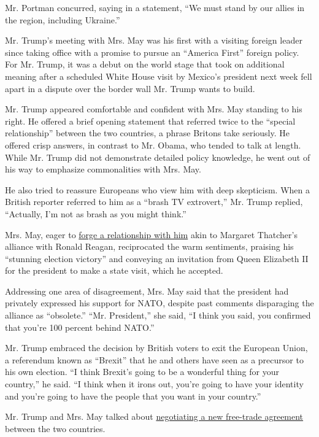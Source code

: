 Mr. Portman concurred, saying in a statement, ``We must stand by our
allies in the region, including Ukraine.''

Mr. Trump's meeting with Mrs. May was his first with a visiting foreign
leader since taking office with a promise to pursue an ``America First''
foreign policy. For Mr. Trump, it was a debut on the world stage that
took on additional meaning after a scheduled White House visit by
Mexico's president next week fell apart in a dispute over the border
wall Mr. Trump wants to build.

Mr. Trump appeared comfortable and confident with Mrs. May standing to
his right. He offered a brief opening statement that referred twice to
the ``special relationship'' between the two countries, a phrase Britons
take seriously. He offered crisp answers, in contrast to Mr. Obama, who
tended to talk at length. While Mr. Trump did not demonstrate detailed
policy knowledge, he went out of his way to emphasize commonalities with
Mrs. May.

He also tried to reassure Europeans who view him with deep skepticism.
When a British reporter referred to him as a ``brash TV extrovert,'' Mr.
Trump replied, ``Actually, I'm not as brash as you might think.''

Mrs. May, eager to
\href{https://www.nytimes3xbfgragh.onion/2017/01/27/world/europe/theresa-may-trump.html}{forge
a relationship with him} akin to Margaret Thatcher's alliance with
Ronald Reagan, reciprocated the warm sentiments, praising his ``stunning
election victory'' and conveying an invitation from Queen Elizabeth II
for the president to make a state visit, which he accepted.

Addressing one area of disagreement, Mrs. May said that the president
had privately expressed his support for NATO, despite past comments
disparaging the alliance as ``obsolete.'' ``Mr. President,'' she said,
``I think you said, you confirmed that you're 100 percent behind NATO.''

Mr. Trump embraced the decision by British voters to exit the European
Union, a referendum known as ``Brexit'' that he and others have seen as
a precursor to his own election. ``I think Brexit's going to be a
wonderful thing for your country,'' he said. ``I think when it irons
out, you're going to have your identity and you're going to have the
people that you want in your country.''

Mr. Trump and Mrs. May talked about
\href{https://www.nytimes3xbfgragh.onion/2017/01/26/business/trump-trade-theresa-may-uk-britain.html}{negotiating
a new free-trade agreement} between the two countries.

